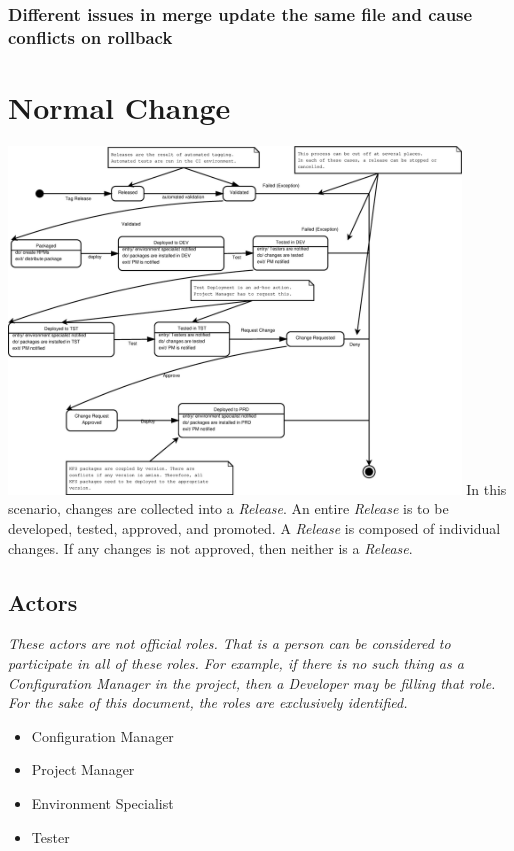 \documentclass[12pt,notitlepage]{article}
\begin{document}
\subsubsection{Different issues in merge update the same file and cause conflicts on rollback}

\section{Normal Change}
\includegraphics[width=12cm]{Diagrams/ChangePromotion_State4.eps}
In this scenario, changes are collected into a \emph{Release}. An entire \emph{Release} is to be
developed, tested, approved, and promoted. A \emph{Release} is composed of individual changes. If
any changes is not approved, then neither is a \emph{Release}.

\subsection{Actors}
\emph{These actors are not official roles. That is a person can be considered to
participate in all of these roles. For example, if there is no such thing as a Configuration
Manager in the project, then a Developer may be filling that role. For the sake of
this document, the roles are exclusively identified.}
\begin{itemize}
\item Configuration Manager
\item Project Manager
\item Environment Specialist
\item Tester
\end{itemize}
\end{document}
